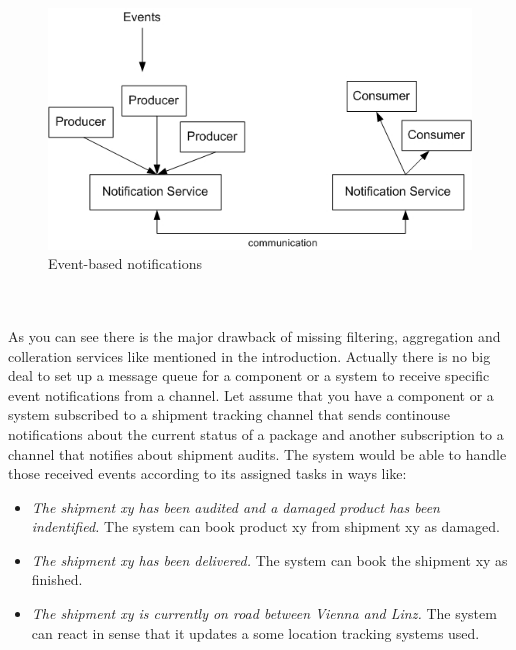 \documentclass[a4paper,titlepage,11pt,DIV10,BCOR0.5cm,headinclude]{article}
\begin{document}
\\\\
\begin{figure} [ht]                
	\centering                                           
	\includegraphics[width=1\textwidth]{pics/eventBasedConsumerProducer.jpg}
	\caption{Event-based notifications}             
	\label{fig:event-basedNotifications}
\end{figure}  
\\\\
As you can see there is the major drawback of missing filtering, aggregation and colleration services like mentioned in the introduction. Actually there is no big deal to set up a message queue for a component or a system to receive specific event notifications from a channel. Let assume that you have a component or a system subscribed to a shipment tracking channel that sends continouse notifications about the current status of a package and another subscription to a channel that notifies about shipment audits. The system would be able to handle those received events according to its assigned tasks in ways like: 
\begin{itemize}
	\item \textit{The shipment xy has been audited and a damaged product has been indentified.} The system can book product xy from shipment xy as damaged.
	\item \textit{The shipment xy has been delivered.} The system can book the shipment xy as finished.
	\item \textit{The shipment xy is currently on road between Vienna and Linz.} The system can react in sense that it updates a some location tracking systems used.
\end{itemize}
\end{document}
